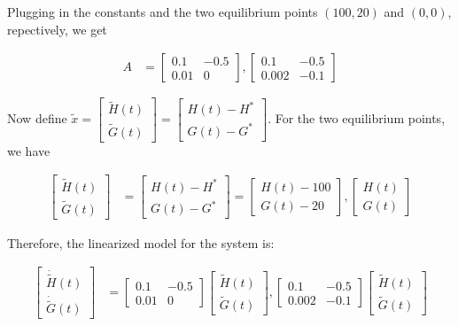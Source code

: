\documentclass[11pt]{article}
\theoremstyle{definition}
\begin{document}
\begin{enumerate}
\begin{enumerate}
        Plugging in the constants and the two equilibrium points $(100, 20)$ and $(0, 0)$, repectively, we get

        \begin{align}
            A &= \begin{bmatrix} 0.1 & -0.5 \\ 0.01 & 0 \end{bmatrix}, \begin{bmatrix} 0.1 & -0.5 \\ 0.002 & -0.1 \end{bmatrix}
        \end{align}

        Now define $\tilde{x} = \begin{bmatrix} \tilde{H}(t) \\ \tilde{G}(t) \end{bmatrix} = \begin{bmatrix} H(t) - H^* \\ G(t) - G^* \end{bmatrix}$.  For the two equilibrium points, we have

        \begin{align}
            \begin{bmatrix} \tilde{H}(t) \\ \tilde{G}(t) \end{bmatrix} &= \begin{bmatrix} H(t) - H^* \\ G(t) - G^* \end{bmatrix} = \begin{bmatrix} H(t) - 100 \\ G(t) - 20 \end{bmatrix}, \begin{bmatrix} H(t) \\ G(t) \end{bmatrix}
        \end{align}

        Therefore, the linearized model for the system is:

        \begin{align}
            \begin{bmatrix} \dot{\tilde{H}}(t) \\ \dot{\tilde{G}}(t) \end{bmatrix} &= \begin{bmatrix} 0.1 & -0.5 \\ 0.01 & 0 \end{bmatrix} \begin{bmatrix} \tilde{H}(t) \\ \tilde{G}(t) \end{bmatrix} , \begin{bmatrix} 0.1 & -0.5 \\ 0.002 & -0.1 \end{bmatrix} \begin{bmatrix} \tilde{H}(t) \\ \tilde{G}(t) \end{bmatrix} 
        \end{align}


\end{enumerate}
\end{enumerate}
\end{document}
